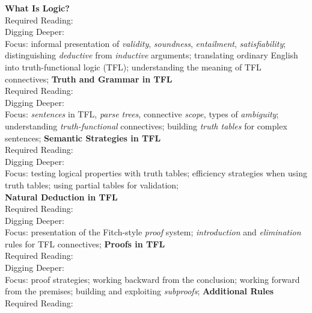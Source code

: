 \begin{outline}[enumerate]

\1 \textbf{What Is Logic?}
\\ Required Reading: \cite[Chapters 1-5 (pp. 2-48)]{Mag25} \\
Digging Deeper: \cite[Chapters 1-4,6-7,11 (pp. 1-39,44-58,94-104)]{Smi20} \\
Focus:
informal presentation of \emph{validity}, \emph{soundness}, \emph{entailment},
\emph{satisfiability}; distinguishing \emph{deductive} from \emph{inductive}
arguments; translating ordinary English into truth-functional logic (TFL);
understanding the meaning of TFL connectives;
\1 \textbf{Truth and Grammar in TFL}
\\ Required Reading: \cite[Chapters 6-11 (pp. 49-84)]{Mag25} \\
Digging Deeper: \cite[Chapters 8-13,18-19 (pp. 59-120,148-172)]{Smi20} \\
Focus:
\emph{sentences} in TFL, \emph{parse trees}, connective \emph{scope}, types of
\emph{ambiguity}; understanding \emph{truth-functional} connectives; building
\emph{truth tables} for complex sentences;
\1 \textbf{Semantic Strategies in TFL}
\\ Required Reading: \cite[Chapters 12-15 (pp. 85-108)]{Mag25} \\
Digging Deeper: \cite[Chapters 14-16 (pp. 120-137)]{Smi20} \\
Focus:
testing logical properties with truth tables; efficiency strategies when using
truth tables; using partial tables for validation;\\
\1 \textbf{Natural Deduction in TFL}
\\ Required Reading: \cite[Chapter 16-17 (pp. 110-141)]{Mag25} \\
Digging Deeper: \cite[Chapters 20-22 (pp. 172-211)]{Smi20} \\
Focus:
presentation of the Fitch-style \emph{proof} system; \emph{introduction} and
\emph{elimination} rules for TFL connectives;
\1 \textbf{Proofs in TFL}
\\ Required Reading: \cite[Chapter 18 (pp. 142-161)]{Mag25} \\
Digging Deeper: \cite[Chapter 17 (pp. 145-147)]{Smi20} \\
Focus:
proof strategies; working backward from the conclusion; working forward from
the premises; building and exploiting \emph{subproofs};
\1 \textbf{Additional Rules}
\\ Required Reading: \cite[Chapters 19-21 (pp. 162-181)]{Mag25} \\

\end{outline}
